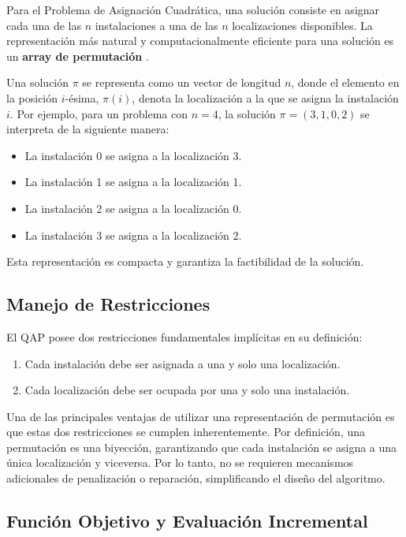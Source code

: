 \documentclass[12pt, a4paper]{article}
\begin{document}
Para el Problema de Asignación Cuadrática, una solución consiste en asignar cada una de las \(n\) instalaciones a una de las \(n\) localizaciones disponibles. La representación más natural y computacionalmente eficiente para una solución es un \textbf{array de permutación} \cite{burkard1998}.

Una solución \(\pi\) se representa como un vector de longitud \(n\), donde el elemento en la posición \(i\)-ésima, \(\pi(i)\), denota la localización a la que se asigna la instalación \(i\). Por ejemplo, para un problema con \(n=4\), la solución \(\pi = (3, 1, 0, 2)\) se interpreta de la siguiente manera:
\begin{itemize}
    \item La instalación 0 se asigna a la localización 3.
    \item La instalación 1 se asigna a la localización 1.
    \item La instalación 2 se asigna a la localización 0.
    \item La instalación 3 se asigna a la localización 2.
\end{itemize}
Esta representación es compacta y garantiza la factibilidad de la solución.

\subsection{Manejo de Restricciones}

El QAP posee dos restricciones fundamentales implícitas en su definición:
\begin{enumerate}
    \item Cada instalación debe ser asignada a una y solo una localización.
    \item Cada localización debe ser ocupada por una y solo una instalación.
\end{enumerate}
Una de las principales ventajas de utilizar una representación de permutación es que estas dos restricciones se cumplen inherentemente. Por definición, una permutación es una biyección, garantizando que cada instalación se asigna a una única localización y viceversa. Por lo tanto, no se requieren mecanismos adicionales de penalización o reparación, simplificando el diseño del algoritmo.

\subsection{Función Objetivo y Evaluación Incremental}
\end{document}
